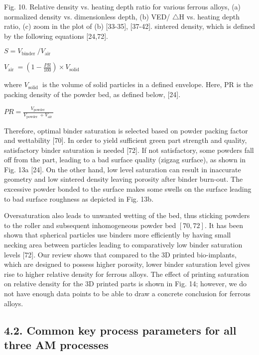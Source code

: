 \documentclass[10pt]{article}
\begin{document}
Fig. 10. Relative density vs. heating depth ratio for various ferrous alloys, (a) normalized density vs. dimensionless depth, (b) VED/ $\triangle \mathrm{H}$ vs. heating depth ratio, (c) zoom in the plot of (b) [33-35], [37-42]. sintered density, which is defined by the following equations [24,72].

$S=V_{\text {binder }} / V_{\text {air }}$

$V_{\text {air }}=\left(1-\frac{P R}{100}\right) \times V_{\text {solid }}$

where $V_{\text {solid }}$ is the volume of solid particles in a defined envelope. Here, PR is the packing density of the powder bed, as defined below, [24].

$P R=\frac{V_{\text {powder }}}{V_{\text {powder }}+V_{\text {air }}}$

Therefore, optimal binder saturation is selected based on powder packing factor and wettability [70]. In order to yield sufficient green part strength and quality, satisfactory binder saturation is needed [72]. If not satisfactory, some powders fall off from the part, leading to a bad surface quality (zigzag surface), as shown in Fig. 13a [24]. On the other hand, low level saturation can result in inaccurate geometry and low sintered density leaving porosity after binder burn-out. The excessive powder bonded to the surface makes some swells on the surface leading to bad surface roughness as depicted in Fig. 13b.

Oversaturation also leads to unwanted wetting of the bed, thus sticking powders to the roller and subsequent inhomogeneous powder bed $[70,72]$. It has been shown that spherical particles use binders more efficiently by having small necking area between particles leading to comparatively low binder saturation levels [72]. Our review shows that compared to the 3D printed bio-implants, which are designed to possess higher porosity, lower binder saturation level gives rise to higher relative density for ferrous alloys. The effect of printing saturation on relative density for the 3D printed parts is shown in Fig. 14; however, we do not have enough data points to be able to draw a concrete conclusion for ferrous alloys.

\subsection*{4.2. Common key process parameters for all three AM processes}
\end{document}
